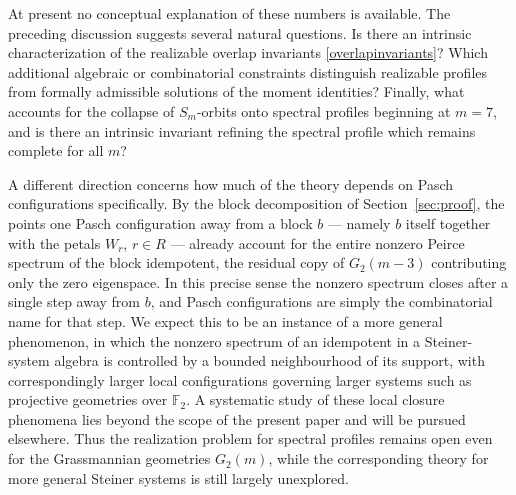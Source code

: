 \documentclass[times,11pt,reqno]{amsproc}
\theoremstyle{definition}
\numberwithin{equation}{section}
\begin{document}
At present no conceptual explanation of these numbers is available. The
preceding discussion suggests several natural questions. Is there an
intrinsic characterization of the realizable overlap invariants \eqref{overlapinvariants}?
Which additional algebraic or combinatorial constraints distinguish
realizable profiles from formally admissible solutions of the moment
identities?
Finally, what accounts for the
collapse of $S_m$-orbits onto spectral profiles beginning at $m=7$, and
is there an intrinsic invariant refining the spectral profile which
remains complete for all $m$?

A different direction concerns how much of the theory depends on Pasch
configurations specifically. By the block decomposition of
Section~\ref{sec:proof}, the points one Pasch configuration away from a
block $b$ --- namely $b$ itself together with the petals $W_r$, $r\in
R$ --- already account for the entire nonzero Peirce spectrum of the
block idempotent, the residual copy of $G_2(m-3)$ contributing only the zero eigenspace. In this precise sense the nonzero spectrum closes after a single step away from $b$, and Pasch configurations are simply the combinatorial name for that step. We expect this to be an instance of a more general phenomenon, in which the nonzero spectrum of an idempotent in a Steiner-system algebra is controlled by a bounded neighbourhood of its support, with correspondingly larger local configurations governing larger systems such as projective geometries over $\mathbb F_2$. A
systematic study of these local closure phenomena lies beyond the scope of the present paper and will be pursued elsewhere.
Thus the realization problem for spectral profiles remains open even for the Grassmannian geometries $G_2(m)$, while the corresponding theory for more general Steiner systems is still largely unexplored.
\end{document}
